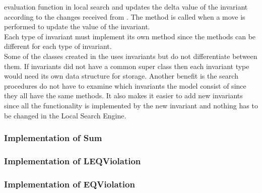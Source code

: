 evaluation function in local search and updates the delta value of the invariant according to the changes 
received from . The method  is called when a move is performed to update the 
value of the invariant. \\ 
Each type of invariant must implement its own method since the methods can be different for each type of invariant. \\ 
Some of the classes created in the  uses invariants but do not differentiate between them. 
If invariants did not have a common super class then each invariant type would need its own data structure for 
storage. Another benefit is the search procedures do not have to examine which invariants the model consist of since 
they 
all have the same methods. It also makes it easier to add new invariants since all the functionality is implemented by 
the new invariant and nothing has to be changed in the Local Search Engine. \\ 
\subsubsection{Implementation of Sum}
\subsubsection{Implementation of LEQViolation}
\subsubsection{Implementation of EQViolation}